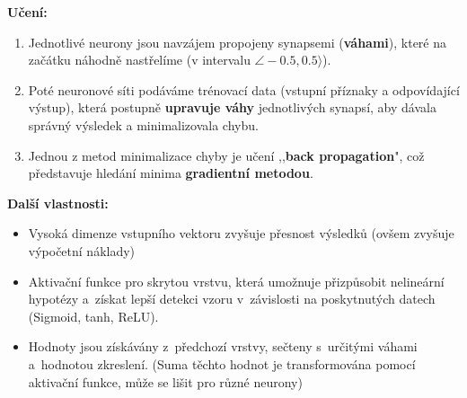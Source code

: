 \textbf{Učení:}
\begin{enumerate}
\item Jednotlivé neurony jsou navzájem propojeny synapsemi (\textbf{váhami}), které na začátku náhodně nastřelíme (v intervalu $\angle -0.5, 0.5 \rangle$).
\item Poté neuronové síti podáváme trénovací data (vstupní příznaky a odpovídající výstup), která postupně \textbf{upravuje váhy} jednotlivých synapsí, aby dávala správný výsledek a minimalizovala chybu.
\item Jednou z metod minimalizace chyby je učení ,,\textbf{back propagation}", což představuje hledání minima \textbf{gradientní metodou}.
\end{enumerate}

\textbf{Další vlastnosti:}
\begin{itemize}
	\item Vysoká dimenze vstupního vektoru zvyšuje přesnost výsledků (ovšem zvyšuje výpočetní náklady)
	\item Aktivační funkce pro skrytou vrstvu, která umožnuje přizpůsobit nelineární hypotézy a~získat lepší detekci vzoru v~závislosti na poskytnutých datech (Sigmoid, tanh, ReLU).
	\item Hodnoty jsou získávány z~předchozí vrstvy, sečteny s~určitými váhami a~hodnotou zkreslení. (Suma těchto hodnot je transformována pomocí aktivační funkce, může se lišit pro různé neurony)
\end{itemize}

